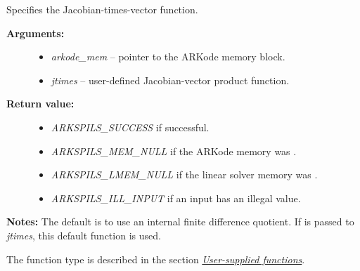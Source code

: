 \documentclass[letterpaper,10pt,english]{sphinxmanual}
\begin{document}
\begin{fulllineitems}
\label{c_interface/User_callable:ARKSpilsSetJacTimesVecFn}
Specifies the Jacobian-times-vector function.
\begin{description}
\item[{\textbf{Arguments:}}] \leavevmode\begin{itemize}
\item {} 
\emph{arkode\_mem} -- pointer to the ARKode memory block.

\item {} 
\emph{jtimes} -- user-defined Jacobian-vector product function.

\end{itemize}

\item[{\textbf{Return value:}}] \leavevmode\begin{itemize}
\item {} 
\emph{ARKSPILS\_SUCCESS} if successful.

\item {} 
\emph{ARKSPILS\_MEM\_NULL} if the ARKode memory was .

\item {} 
\emph{ARKSPILS\_LMEM\_NULL} if the linear solver memory was .

\item {} 
\emph{ARKSPILS\_ILL\_INPUT} if an input has an illegal value.

\end{itemize}

\end{description}

\textbf{Notes:} The default is to use an internal finite difference
quotient.  If  is passed to \emph{jtimes}, this default function is used.

The function type {\hyperref[c_interface/User_supplied:ARKSpilsJacTimesVecFn]{}} is described in the
section {\hyperref[c_interface/User_supplied:cinterface-usersupplied]{\emph{User-supplied functions}}}.

\end{fulllineitems}

\end{document}

